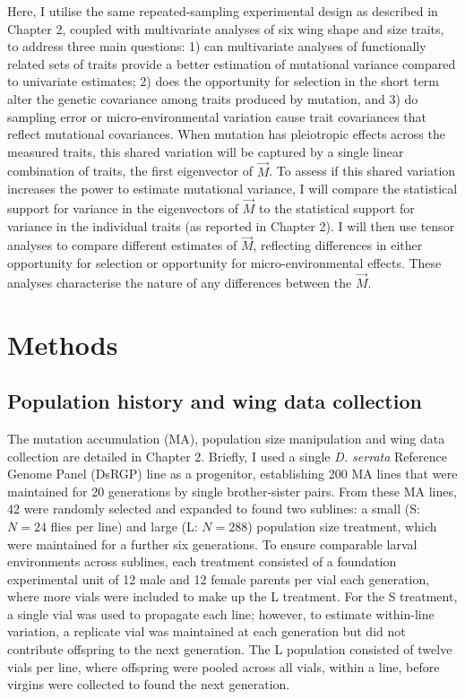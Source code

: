Here, I utilise the same repeated-sampling experimental design as described in Chapter 2, coupled with multivariate analyses of six wing shape and size traits, to address three main questions: 1) can multivariate analyses of functionally related sets of traits provide a better estimation of mutational variance compared to univariate estimates; 2) does the opportunity for selection in the short term alter the genetic covariance among traits produced by mutation, and 3) do sampling error or micro-environmental variation cause trait covariances that reflect mutational covariances. When mutation has pleiotropic effects across the measured traits, this shared variation will be captured by a single linear combination of traits, the first eigenvector of $\vec{M}$. To assess if this shared variation increases the power to estimate mutational variance, I will compare the statistical support for variance in the eigenvectors of $\vec{M}$ to the statistical support for variance in the individual traits (as reported in Chapter 2). I will then use tensor analyses to compare different estimates of $\vec{M}$, reflecting differences in either opportunity for selection or opportunity for micro-environmental effects. These analyses characterise the nature of any differences between the $\vec{M}$. \par

\section{Methods}
\subsection{Population history and wing data collection}
The mutation accumulation (MA), population size manipulation and wing data collection are detailed in Chapter 2. Briefly, I used a single \textit{D. serrata} Reference Genome Panel (DsRGP) line \citep{Redd18} as a progenitor, establishing 200 MA lines that were maintained for 20 generations by single brother-sister pairs. From these MA lines, 42 were randomly selected and expanded to found two sublines: a small (S: $N = 24$ flies per line) and large (L: $N = 288$) population size treatment, which were maintained for a further six generations. To ensure comparable larval environments across sublines, each treatment consisted of a foundation experimental unit of 12 male and 12 female parents per vial each generation, where more vials were included to make up the L treatment. For the S treatment, a single vial was used to propagate each line; however, to estimate within-line variation, a replicate vial was maintained at each generation but did not contribute offspring to the next generation. The L population consisted of twelve vials per line, where offspring were pooled across all vials, within a line, before virgins were collected to found the next generation.\par

